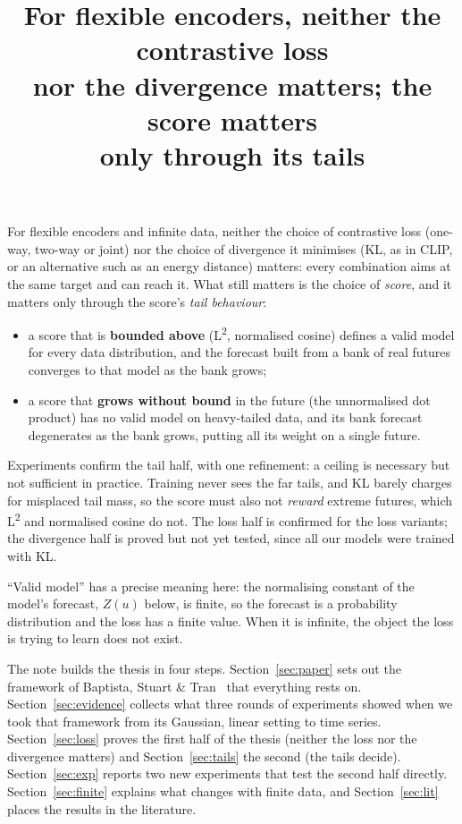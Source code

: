 \documentclass[11pt]{article}
\title{For flexible encoders, neither the contrastive loss\\ nor the divergence matters;
the score matters\\ only through its tails}
\author{}
\date{}
\newcommand{\Ltwo}{L\textsuperscript{2}}
\theoremstyle{plain}
\theoremstyle{definition}
\theoremstyle{remark}
\begin{document}
\maketitle

\begin{tcolorbox}[colback=blue!3!white,colframe=blue!40!black,title=Thesis]
For flexible encoders and infinite data, neither the choice of contrastive loss (one-way,
two-way or joint) nor the choice of divergence it minimises (KL, as in CLIP, or an
alternative such as an energy distance) matters: every combination aims at the same target
and can reach it. What still matters is the choice of \emph{score}, and it matters only
through the score's \emph{tail behaviour}:
\begin{itemize}
\item a score that is \textbf{bounded above} (\Ltwo{}, normalised cosine) defines a valid
  model for every data distribution, and the forecast built from a bank of real futures
  converges to that model as the bank grows;
\item a score that \textbf{grows without bound} in the future (the unnormalised dot product)
  has no valid model on heavy-tailed data, and its bank forecast degenerates as the bank
  grows, putting all its weight on a single future.
\end{itemize}
Experiments confirm the tail half, with one refinement: a ceiling is necessary but not
sufficient in practice. Training never sees the far tails, and KL barely charges for
misplaced tail mass, so the score must also not \emph{reward} extreme futures, which
\Ltwo{} and normalised cosine do not. The loss half is confirmed for the loss variants; the
divergence half is proved but not yet tested, since all our models were trained with KL.
\end{tcolorbox}

\noindent
``Valid model'' has a precise meaning here: the normalising constant of the model's forecast,
$Z(u)$ below, is finite, so the forecast is a probability distribution and the loss has a
finite value. When it is infinite, the object the loss is trying to learn does not exist.

\medskip\noindent
The note builds the thesis in four steps. Section~\ref{sec:paper} sets out the framework of
Baptista, Stuart \& Tran~\cite{bst} that everything rests on. Section~\ref{sec:evidence}
collects what three rounds of experiments showed when we took that framework from its
Gaussian, linear setting to time series. Section~\ref{sec:loss} proves the first half of the
thesis (neither the loss nor the divergence matters) and Section~\ref{sec:tails} the second
(the tails decide).
Section~\ref{sec:exp} reports two new experiments that test the second half directly.
Section~\ref{sec:finite} explains what changes with finite data, and
Section~\ref{sec:lit} places the results in the literature.
\end{document}
